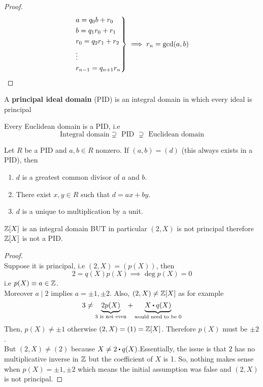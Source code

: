 \documentclass[../Main.tex]{subfiles}
\begin{document}
\begin{proof}\[
	\begin{rcases*}
	a=q_0b+r_0\\
	b=q_1r_0+r_1\\
	r_0=q_2r_1+r_2\\
	\vdots\\
	r_{n-1}=q_{n+1}r_n
	\end{rcases*} \implies r_n = \gcd(a,b)\]
\end{proof}
\begin{dfn}[title = Principal Ideal Domain]
	A \textbf{principal ideal domain} (PID) is an integral domain in which every ideal is principal
\end{dfn}
\begin{thm}[title = Euclidean domain is PID is Integral domain]
	Every Euclidean domain is a PID, i.e
	\[\text{Integral domain} \supsetneq \text{ PID } \supsetneq \text{ Euclidean domain}\]
\end{thm}
\begin{thm}
	Let $R$ be a PID and $a,b\in R$ nonzero.
	If $(a,b)=(d)$ (this always exists in a PID), then
	\begin{enumerate}[label=(\arabic*)]
		\item $d$ is a greatest common divisor of $a$ and $b$.
		\item There exist $x,y\in R$ such that $d=ax+by$.
		\item $d$ is a unique to multiplication by a unit.
	\end{enumerate}
\end{thm}
\begin{claim}
	$\mathbb{Z}[X]$ is an integral domain BUT in particular $(2,X)$ is not principal therefore $\mathbb{Z}[X]$ is not a PID.
\end{claim}
\begin{proof}~\\
	Suppose it is principal, i.e $(2,X)=(p(X))$, then 
	\[2=q(X)p(X) \implies \deg p(X)=0\]
	i.e $p(X)\equiv a\in \mathbb{Z}$.\\
	Moreover $a\mid 2$ implies $a=\pm1,\pm2$. Also, $(2,X)\ne \mathbb{Z}[X]$ as for example
	\[3\ne \underbrace{2p(X)}_{3 \text{ is not even}}+\underbrace{X\rdot q(X)}_{\text{would need to be } 0}\]
	Then, $p(X)\ne \pm 1$ otherwise $(2,X)=(1)=\mathbb{Z}[X]$. Therefore $p(X)$ must be $\pm 2$.\\
	But $(2,X) \ne (2)$ because $X \ne 2\rdot q(X)$.Essentially, the issue is that $2$ has no multiplicative inverse in $\mathbb{Z}$ but the coefficient of $X$ is 1. So, nothing makes sense when $p(X)=\pm1,\pm2$ which means the initial assumption was false and $(2,X)$ is not principal.
\end{proof}
\end{document}
